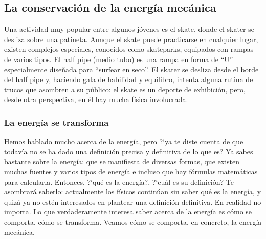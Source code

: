 \documentclass[11pt]{book}
\newcommand{\choice}{\item}
\begin{document}
\subsection{La conservaci\'on de la energ\'ia mec\'anica}

Una actividad muy popular entre algunos j\'ovenes es el skate, donde el skater
se desliza sobre una patineta. Aunque el skate puede practicarse en cualquier
lugar, existen complejos especiales, conocidos como skateparks, equipados
con rampas de varios tipos. El half pipe (medio tubo) es una rampa en forma
de ``U'' especialmente diseñada para ``surfear en seco''.
El skater se desliza desde el borde del half pipe y, haciendo gala de habilidad y equilibro, intenta alguna rutina de trucos que asombren a su p\'ublico:
el skate es un deporte de exhibici\'on, pero, desde otra perspectiva, en \'el hay
mucha f\'isica involucrada.

\subsubsection{La energ\'ia se transforma}
Hemos hablado mucho acerca de la energ\'ia, pero ?`ya te diste cuenta de que
todav\'ia
no se ha dado una definici\'on precisa y definitiva de lo que es? Ya sabes
bastante sobre
la energ\'ia: que se manifiesta de diversas formas, que existen muchas fuentes y
varios
tipos de energ\'ia e incluso que hay f\'ormulas matem\'aticas para calcularla.
Entonces,
?`qu\'e es la energ\'ia?, ?`cu\'al es su definici\'on? Te asombrar\'a saberlo: actualmente
los f\'isicos contin\'uan sin saber qu\'e es la energ\'ia, y quiz\'a ya no est\'en
interesados en plantear
una definici\'on definitiva. En realidad no importa. Lo que verdaderamente
interesa
saber acerca de la energ\'ia es c\'omo se comporta, c\'omo se transforma.
Veamos c\'omo se comporta, en concreto, la energ\'ia mec\'anica.
\end{document}
